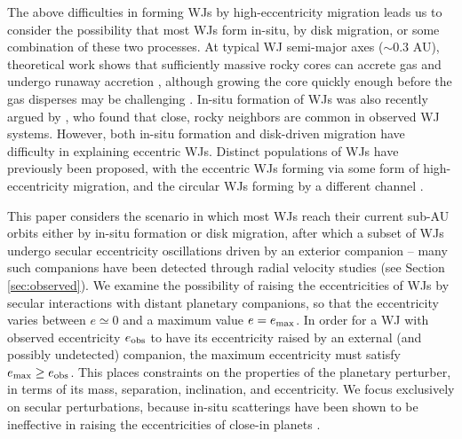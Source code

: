 \documentclass[12pt,useAMS, usenatbib]{mn2e}
\newcommand{\Max}{{\rm max}}
\newcommand{\emax}{e_\Max}
\newcommand{\eobs}{e_{\rm obs}}
\begin{document}
The above difficulties in forming WJs by high-eccentricity migration leads us to consider the possibility that most WJs form in-situ, by disk migration, or some combination of these two processes.  At typical WJ semi-major axes ($\sim 0.3$ AU), theoretical work shows that sufficiently massive rocky cores can accrete gas and undergo runaway accretion \citep{lee2014}, although growing the core quickly enough before the gas disperses may be challenging \citep{lee2016}.  In-situ formation of WJs was also recently argued by \cite{huang2016}, who found that close, rocky neighbors are common in observed WJ systems.  However, both in-situ formation and disk-driven migration have difficulty in explaining eccentric WJs.  Distinct populations of WJs have previously been proposed, with the eccentric WJs forming via some form of high-eccentricity migration, and the circular WJs forming by a different channel \citep{dawson2013,petrovich2016}.

This paper considers the scenario in which most WJs reach their current sub-AU orbits either by in-situ formation or disk migration, after which a subset of WJs undergo secular eccentricity oscillations driven by an exterior companion -- many such companions have been detected through radial velocity studies (see Section \ref{sec:observed}).  We examine the possibility of raising the eccentricities of WJs by secular interactions with distant planetary companions, so that the eccentricity varies between $e \simeq 0$ and a maximum value $e = \emax$.  In order for a WJ with observed eccentricity $\eobs$ to have its eccentricity raised by an external (and possibly undetected) companion, the maximum eccentricity must satisfy $\emax \geq \eobs$.  This places constraints on the properties of the planetary perturber, in terms of its mass, separation, inclination, and eccentricity.  We focus exclusively on secular perturbations, because in-situ scatterings have been shown to be ineffective in raising the eccentricities of close-in planets \citep{petrovich2014}.
\end{document}

